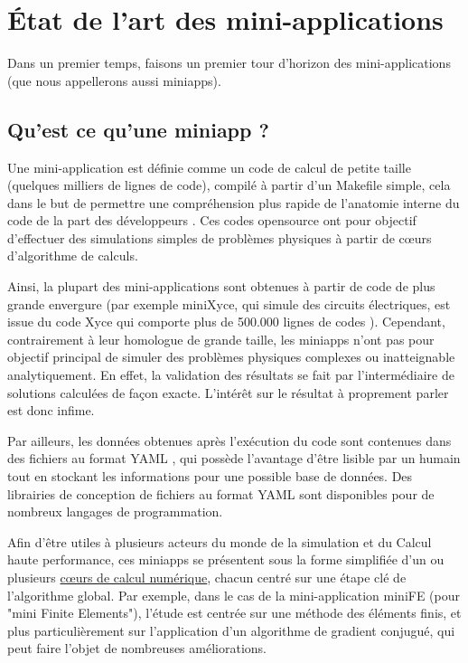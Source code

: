 \documentclass[11pt,a4paper,oneside]{memoir}
\theoremstyle{definition}
\theoremstyle{remark}
\theoremstyle{plain}
\begin{document}
\newpage


\chapter{\'Etat de l'art des mini-applications}

Dans un premier temps, faisons un premier tour d'horizon des mini-applications (que nous appellerons aussi miniapps).

\section{Qu'est ce qu'une miniapp ?}

Une mini-application est définie comme un code de calcul de petite taille (quelques milliers de lignes de code), compilé à partir d'un Makefile simple, cela dans le but de permettre une compréhension plus rapide de l'anatomie interne du code de la part des développeurs \cite{sandia2009}. Ces codes opensource ont pour objectif d'effectuer des simulations simples de problèmes physiques à partir de cœurs d'algorithme de calculs.

Ainsi, la plupart des mini-applications sont obtenues à partir de code de plus grande envergure (par exemple miniXyce, qui simule des circuits électriques, est issue du code Xyce qui comporte plus de 500.000 lignes de codes \cite{sandia2009}). Cependant, contrairement à leur homologue de grande taille, les miniapps n'ont pas pour objectif principal de simuler des problèmes physiques complexes ou inatteignable analytiquement. En effet, la validation des résultats se fait par l'intermédiaire de solutions calculées de façon exacte. L'intérêt sur le résultat à proprement parler est donc infime.

Par ailleurs, les données obtenues après l'exécution du code sont contenues dans des fichiers au format YAML \cite{yaml}, qui possède l'avantage d'être lisible par un humain tout en stockant les informations pour une possible base de données. Des librairies de conception de fichiers au format YAML sont disponibles pour de nombreux langages de programmation.\bigskip

Afin d'être utiles à plusieurs acteurs du monde de la simulation et du Calcul haute performance, ces miniapps se présentent sous la forme simplifiée d'un ou plusieurs \underline{cœurs de calcul numérique}, chacun centré sur une étape clé de l'algorithme global. Par exemple, dans le cas de la mini-application miniFE (pour "mini Finite Elements"), l'étude est centrée sur une méthode des éléments finis, et plus particulièrement sur l'application d'un algorithme de gradient conjugué, qui peut faire l'objet de nombreuses améliorations.
\end{document}
